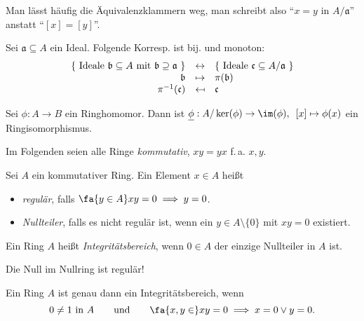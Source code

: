 \documentclass{cheat-sheet}
\newcommand{\aaa}{\mathfrak{a}}
\newcommand{\bbb}{\mathfrak{b}}
\newcommand{\ccc}{\mathfrak{c}}
\begin{document}
\begin{nota}
  Man lässt häufig die Äquivalenzklammern weg, man schreibt also
  "`$x = y$ in $A/\aaa$"' anstatt "`$[x] = [y]$"'.
\end{nota}

\begin{prop}
  Sei $\aaa \subseteq A$ ein Ideal.
  Folgende Korresp. ist bij. und monoton:
  \[
    \begin{array}{r c l}
      \{ \text{ Ideale $\bbb \subseteq A$ mit $\bbb \supseteq \aaa$ } \} & \leftrightarrow & \{ \text{ Ideale $\ccc \subseteq A/\aaa$ } \} \\
      \bbb & \mapsto & \pi(\bbb) \\
      \pi^{-1}(\ccc) & \mapsfrom & \ccc
    \end{array}
  \]
\end{prop}

\begin{prop}
  Sei $\phi : A \to B$ ein Ringhomomor.
  Dann ist $\underline{\phi} : A / \ker(\phi) \to \im(\phi), \enspace [x] \mapsto \phi(x)$ ein Ringisomorphismus.
\end{prop}



Im Folgenden seien alle Ringe \emph{kommutativ}, \dh{} $xy = yx$ f.\,a. $x, y$.

\begin{defn}
  Sei $A$ ein kommutativer Ring.
  Ein Element $x \in A$ heißt
  \begin{itemize}
    \item \emph{regulär}, falls $\fa{y \in A} xy = 0 \implies y = 0$.
    \item \emph{Nullteiler}, falls es nicht regulär ist, \dh{} wenn ein $y \in A \setminus \{ 0 \}$ mit $xy = 0$ existiert.
  \end{itemize}
\end{defn}

\begin{defn}
  Ein Ring $A$ heißt \emph{Integritätsbereich}, wenn $0 \in A$ der einzige Nullteiler in $A$ ist.
\end{defn}

\begin{acht}
  Die Null im Nullring ist regulär!
\end{acht}

\begin{bem}
  Ein Ring $A$ ist genau dann ein Integritätsbereich, wenn
  \[
    0 \neq 1 \text{ in $A$}
    \qquad \text{und} \qquad
    \fa{x, y \in } xy = 0 \implies x = 0 \vee y = 0.
  \]
\end{bem}
\end{document}
